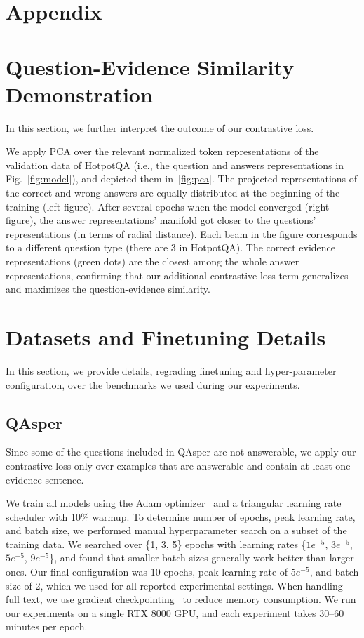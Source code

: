 \section*{Appendix}

\section{Question-Evidence Similarity Demonstration}
\label{sec:appndx1}

In this section, we further interpret the outcome of our contrastive loss.

We apply PCA over the relevant normalized token representations of the validation data of HotpotQA (i.e., the question and answers representations in Fig.~\ref{fig:model}), and depicted them in~\ref{fig:pca}. The projected representations of the correct and wrong answers are equally distributed at the beginning of the training (left figure). After several epochs when the model converged (right figure), the answer representations' manifold got closer to the questions' representations (in terms of radial distance). Each beam in the figure corresponds to a different question type (there are 3 in HotpotQA). The correct evidence representations (green dots) are the closest among the whole answer representations, confirming that our additional contrastive loss term generalizes and maximizes the question-evidence similarity. 


\section{Datasets and Finetuning Details}
\label{sec:appndx2}
In this section, we provide details, regrading finetuning and hyper-parameter configuration, over the benchmarks we used during our experiments.

\subsection{QAsper}
\label{subsec:qasper}
Since some of the questions included in QAsper are not answerable, we apply our contrastive loss only over examples that are answerable and contain at least one evidence sentence. 

We train all models using the Adam optimizer~\citep{kingma2014adam} and a triangular learning rate scheduler \cite{howard2018universal} with 10\% warmup. To determine number of epochs, peak learning rate, and batch size, we performed manual hyperparameter search on a subset of the training data. We searched over \{1, 3, 5\} epochs with learning rates \{$1e^{-5}$, $3e^{-5}$, $5e^{-5}$, $9e^{-5}$\}, and found that smaller batch sizes generally work better than larger ones. Our final configuration was 10 epochs, peak learning rate of $5e^{-5}$, and batch size of 2, which we used for all reported experimental settings.  When handling full text, we use gradient checkpointing~\cite{gradckpt} to reduce memory consumption. We run our experiments on a single RTX 8000 GPU, and each experiment takes 30--60 minutes per epoch. 


